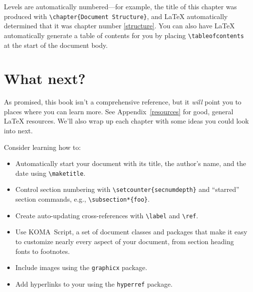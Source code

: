 Levels are automatically numbered---for example,
the title of this chapter was produced with \verb|\chapter{Document Structure}|,
and \LaTeX{} automatically determined that it was chapter number \ref{structure}.
You can also have \LaTeX{} automatically generate a table of contents for you
by placing \verb|\tableofcontents| at the start of the document body.

\section{What next?}

As promised, this book isn't a comprehensive reference,
but it \emph{will} point you to places where you can learn more.
See Appendix~\ref{resources} for good, general \LaTeX{} resources.
We'll also wrap up each chapter with some ideas you could look into next.

Consider learning how to:
\begin{itemize}
\item Automatically start your document with its title, the author's name,
    and the date using \verb|\maketitle|.
\item Control section numbering with \verb|\setcounter{secnumdepth}|
and ``starred'' section commands, e.g., \verb|\subsection*{foo}|.
\item Create auto-updating cross-references with \verb|\label| and \verb|\ref|.
\item Use KOMA~Script, a set of document classes and packages
that make it easy to customize nearly every aspect of your document,
from section heading fonts to footnotes.
\item Include images using the \texttt{graphicx} package.
\item Add hyperlinks to your  using the \texttt{hyperref} package.
\end{itemize}
